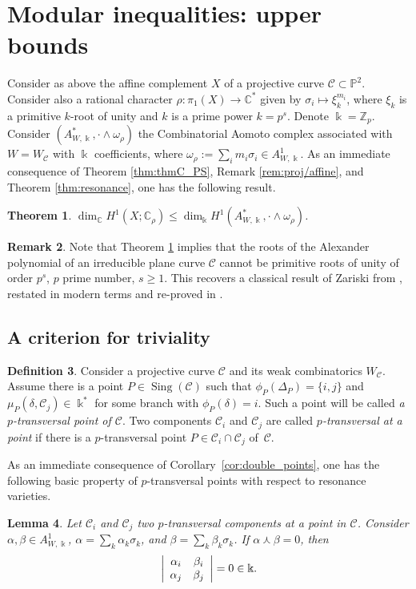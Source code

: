 \documentclass[11pt]{amsart}
\DeclareMathOperator{\Sing}{Sing}
\def\cC{\mathcal{C}}
\def\ZZ{\mathbb{Z}}
\def\CC{\mathbb{C}}
\def\PP{\mathbb{P}}
\def\kk{\Bbbk}
\def\w{\omega}
\theoremstyle{plain}
\newtheorem{thm}{Theorem}
\newtheorem{lemma}[thm]{Lemma}
\theoremstyle{definition}
\newtheorem{definition}[thm]{Definition}
\newtheorem{remark}[thm]{Remark}
\begin{document}
\section{Modular inequalities: upper bounds}
\label{sec:generalcase}
Consider as above the affine complement $X$ of a projective curve $\cC\subset \PP^2$. Consider also a rational character $\rho:\pi_1(X)\to \CC^*$ given by $\sigma_i\mapsto \xi^{m_i}_k$, where $\xi_k$
is a primitive $k$-root of unity and $k$ is a prime power $k=p^s$. Denote $\kk=\ZZ_p$.
Consider $(A^*_{W,\kk},\cdot\wedge\w_{\rho})$ the Combinatorial Aomoto complex associated with $W=W_{\cC}$ with $\kk$ coefficients, where $\omega_\rho:=\sum_i m_i\sigma_i\in A^1_{W,\kk}$. 
As an immediate consequence of Theorem \ref{thm:thmC_PS}, Remark \ref{rem:proj/affine}, and Theorem \ref{thm:resonance}, one has the following result.

\begin{thm}
\label{thm:inequality}
$\dim_\CC H^1(X;\CC_\rho)\leq \dim_\kk H^1(A^*_{W,\kk},\cdot\wedge\w_\rho)$.
\end{thm}

\begin{remark}
\label{rem:zariski_classic_result}
Note that Theorem \ref{thm:inequality} implies that the roots of the Alexander polynomial of an irreducible plane curve $\cC$ cannot be  primitive roots of unity of order $p^s$, $p$ prime number, $s \geq 1$. This recovers a classical result of Zariski from \cite{Z}, restated in modern terms and re-proved in  \cite[Proposition 2.1]{BD}.
\end{remark}

\subsection{A criterion for triviality}
\label{subsec:triv_crit}

\begin{definition}
Consider a projective curve $\cC$ and its weak combinatorics $W_{\cC}$. Assume there is a point $P\in\Sing(\cC)$ such that $\phi_P(\Delta_P)= \{i,j\}$ and $\mu_P(\delta,\cC_j)\in\kk^*$ for some branch with $\phi_P(\delta)=i$. Such a point will be called \emph{a $p$-transversal point of $\cC$}. Two components $\cC_i$ and $\cC_j$ are called \emph{$p$-transversal at a point} if there is a $p$-transversal point $P\in\cC_i\cap\cC_j$ of~$\cC$. 
\end{definition}
As an immediate consequence of Corollary~\ref{cor:double_points},
one has the following basic property of $p$-transversal points with respect to resonance varieties.
\begin{lemma}
\label{lemma:ptransversal}
Let $\cC_i$ and $\cC_j$ two $p$-transversal components at a point in $\cC$.
Consider $\alpha,\beta \in A^1_{W,\kk}$, $\alpha=\sum_k \alpha_k\sigma_k$, and 
$\beta=\sum_k \beta_k\sigma_k$. If $\alpha\curlywedge\beta=0$, then 
$$
\left|
\array{cc}
\alpha_i & \beta_i\\
\alpha_j & \beta_j
\endarray
\right|= 0\in\kk.
$$
\end{lemma}
\end{document}
